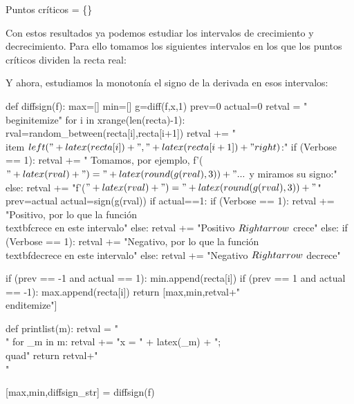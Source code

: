 Puntos críticos = \{\}
\fi



\ifverbose
Con estos resultados ya podemos estudiar los intervalos de crecimiento y decrecimiento. 
%
Para ello tomamos los siguientes intervalos en los que los puntos críticos dividen la recta real:
\fi


\ifverbose
Y ahora, estudiamos la monotonía el signo de la derivada en esos intervalos:
\fi
\begin{sagesilent}

def diffsign(f):
    max=[]
    min=[]
    g=diff(f,x,1)
    prev=0
    actual=0
    retval = "\\begin{itemize}"
    for i in xrange(len(recta)-1):
        rval=random_between(recta[i],recta[i+1])
        retval += "\\item $\\left("+latex(recta[i])+","+latex(recta[i+1])+"\\right)$:"
        if (Verbose == 1):
            retval += " Tomamos, por ejemplo, f'($"+latex(rval)+") = "+latex(round(g(rval),3))+"...$  y miramos su signo:" 
        else:
            retval += "f'($"+latex(rval)+") = "+latex(round(g(rval),3)) +"$"
        prev=actual
        actual=sign(g(rval))
        if actual==1: 
            if (Verbose == 1):
                retval += "Positivo, por lo que la función \\textbf{crece} en este intervalo"  
            else:
                retval += "Positivo $\\Rightarrow$ crece"
        else:
            if (Verbose == 1):
                retval += "Negativo, por lo que la función \\textbf{decrece} en este intervalo"
            else:
                retval += "Negativo $\\Rightarrow$ decrece"

        if (prev == -1 and actual == 1):
            min.append(recta[i])
        if (prev == 1 and actual == -1):
            max.append(recta[i])
    return [max,min,retval+"\\end{itemize}"]

def printlist(m):
    retval = "\\{"
    for _m in m:
    	retval += "x = " + latex(_m) + ";\\quad"
    return retval+"\\}"

[max,min,diffsign_str] = diffsign(f)

\end{sagesilent}

